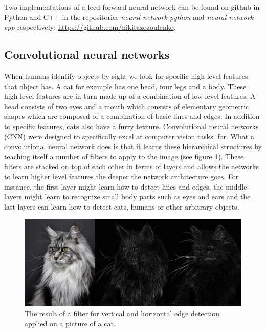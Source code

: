 \documentclass[a4paper,11pt,twoside]{article}
\begin{document}
Two implementations of a feed-forward neural network can be found on github in Python and C++ in the repositories \textit{neural-network-python} and \textit{neural-network-cpp} respectively: \url{https://github.com/nikitazozoulenko}.

\subsection{Convolutional neural networks}
When humans identify objects by sight we look for specific high level features that object has. A cat for example has one head, four legs and a body. These high level features are in turn made up of a combination of low level features: A head consists of two eyes and a mouth which consists of elementary geometric shapes which are composed of a combination of basic lines and edges. In addition to specific features, cats also have a furry texture. Convolutional neural networks (CNN) were designed to specifically excel at computer vision tasks. for. What a convolutional neural network does is that it learns these hierarchical structures by teaching itself a number of filters to apply to the image (see figure \ref{figkatter}). These filters are stacked on top of each other in terms of layers and allows the networks to learn higher level features the deeper the network architecture goes. For instance, the first layer might learn how to detect lines and edges, the middle layers might learn to recognize small body parts such as eyes and ears and the last layers can learn how to detect cats, humans or other arbitrary objects.

\begin{figure}[h]
	\centering
  		\includegraphics[scale=0.33]{katter.png}
  	\caption{The result of a filter for vertical and horizontal edge detection applied on a picture of a cat.} \label{figkatter}
\end{figure}
\end{document}
